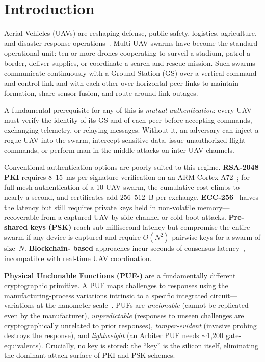 \documentclass[journal,a4paper,10pt]{IEEEtran}
\begin{document}
\section{Introduction}
\label{sec:intro}

 Aerial Vehicles (UAVs) are reshaping
defense, public safety, logistics, agriculture, and disaster-response
operations~\cite{securing_uav_fanet}. Multi-UAV swarms have become the
standard operational unit: ten or more drones cooperating to surveil a
stadium, patrol a border, deliver supplies, or coordinate a
search-and-rescue mission. Such swarms communicate continuously with a
Ground Station (GS) over a vertical command-and-control link and with
each other over horizontal peer links to maintain formation, share
sensor fusion, and route around link outages.

A fundamental prerequisite for any of this is \emph{mutual
authentication}: every UAV must verify the identity of its GS and of
each peer before accepting commands, exchanging telemetry, or relaying
messages. Without it, an adversary can inject a rogue UAV into the
swarm, intercept sensitive data, issue unauthorized flight commands,
or perform man-in-the-middle attacks on inter-UAV channels.

Conventional authentication options are poorly suited to this regime.
\textbf{RSA-2048 PKI} requires $8$--$15$~ms per signature verification
on an ARM Cortex-A72~\cite{puf_lightweight_uav}; for full-mesh
authentication of a 10-UAV swarm, the cumulative cost climbs to nearly
a second, and certificates add $256$--$512$~B per
exchange. \textbf{ECC-256}~\cite{peer2peer_auth} halves the latency
but still requires private keys held in non-volatile memory---
recoverable from a captured UAV by side-channel or cold-boot attacks.
\textbf{Pre-shared keys (PSK)} reach sub-millisecond latency but
compromise the entire swarm if any device is captured and require
$O(N^2)$ pairwise keys for a swarm of size~$N$. \textbf{Blockchain-
based} approaches incur seconds of consensus latency~\cite{puf_ntu},
incompatible with real-time UAV coordination.

\textbf{Physical Unclonable Functions (PUFs)} are a fundamentally
different cryptographic primitive. A PUF maps challenges to responses
using the manufacturing-process variations intrinsic to a specific
integrated circuit---variations at the nanometer
scale~\cite{puf_overview}. PUFs are \emph{unclonable} (cannot be
replicated even by the manufacturer), \emph{unpredictable} (responses
to unseen challenges are cryptographically unrelated to prior
responses), \emph{tamper-evident} (invasive probing destroys the
response), and \emph{lightweight} (an Arbiter PUF needs $\sim$1{,}200
gate-equivalents). Crucially, no key is stored: the ``key'' is the
silicon itself, eliminating the dominant attack surface of PKI and
PSK schemes.
\end{document}
